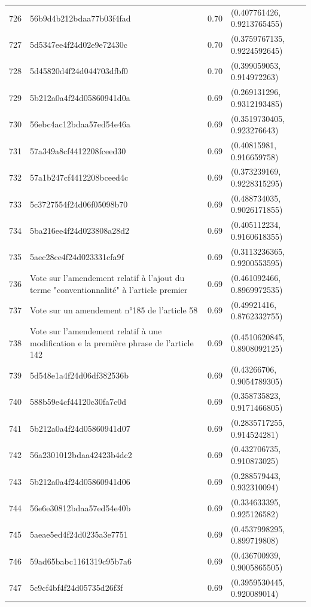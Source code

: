 \begin{table}[ht]
\begin{tabular}{rlrl}
  726 & 56b9d4b212bdaa77b03f4fad & 0.70 & (0.407761426, 0.9213765455) \\ 
  727 & 5d5347ee4f24d02e9e72430c & 0.70 & (0.3759767135, 0.9224592645) \\ 
  728 & 5d45820d4f24d044703dfbf0 & 0.70 & (0.399059053, 0.914972263) \\ 
  729 & 5b212a0a4f24d05860941d0a & 0.69 & (0.269131296, 0.9312193485) \\ 
  730 & 56ebc4ac12bdaa57ed54e46a & 0.69 & (0.3519730405, 0.923276643) \\ 
  731 & 57a349a8cf4412208fceed30 & 0.69 & (0.40815981, 0.916659758) \\ 
  732 & 57a1b247cf4412208bceed4c & 0.69 & (0.373239169, 0.9228315295) \\ 
  733 & 5c3727554f24d06f05098b70 & 0.69 & (0.488734035, 0.9026171855) \\ 
  734 & 5ba216ee4f24d023808a28d2 & 0.69 & (0.405112234, 0.9160618355) \\ 
  735 & 5aec28ce4f24d023331cfa9f & 0.69 & (0.3113236365, 0.9200553595) \\ 
  736 & Vote sur l'amendement relatif à l'ajout du terme "conventionnalité" à l'article premier & 0.69 & (0.461092466, 0.8969972535) \\ 
  737 & Vote sur un amendement n°185 de l'article 58 & 0.69 & (0.49921416, 0.8762332755) \\ 
  738 & Vote sur l'amendement relatif à une modification e la première phrase de l'article 142 & 0.69 & (0.4510620845, 0.8908092125) \\ 
  739 & 5d548e1a4f24d06df382536b & 0.69 & (0.43266706, 0.9054789305) \\ 
  740 & 588b59e4cf44120c30fa7c0d & 0.69 & (0.358735823, 0.9171466805) \\ 
  741 & 5b212a0a4f24d05860941d07 & 0.69 & (0.2835717255, 0.914524281) \\ 
  742 & 56a2301012bdaa42423b4dc2 & 0.69 & (0.432706735, 0.910873025) \\ 
  743 & 5b212a0a4f24d05860941d06 & 0.69 & (0.288579443, 0.932310094) \\ 
  744 & 56e6e30812bdaa57ed54e40b & 0.69 & (0.334633395, 0.925126582) \\ 
  745 & 5aeae5ed4f24d0235a3e7751 & 0.69 & (0.4537998295, 0.899719808) \\ 
  746 & 59ad65babc1161319c95b7a6 & 0.69 & (0.436700939, 0.9005865505) \\ 
  747 & 5c9cf4bf4f24d05735d26f3f & 0.69 & (0.3959530445, 0.920089014) \\ 

\end{tabular}
\end{table}
